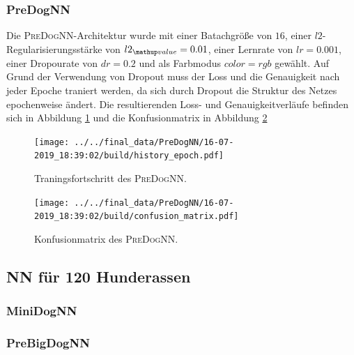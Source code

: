 \subsubsection{PreDogNN}
Die \textsc{PreDogNN}-Architektur wurde mit einer Batachgröße von $16$, einer
$l2$-Regularisierungsstärke von $l2\ua{value}=0.01$, einer Lernrate von
$lr=0.001$, einer Dropourate von $dr=0.2$ und als Farbmodus $color=rgb$ gewählt.
Auf Grund der Verwendung von Dropout muss der Loss und die Genauigkeit nach jeder
Epoche traniert werden, da sich durch Dropout die Struktur des Netzes epochenweise
ändert. Die resultierenden Loss- und Genauigkeitverläufe befinden sich in Abbildung
\ref{fig:PreDogNN_Loss_Acc} und die Konfusionmatrix in Abbildung \ref{fig:PreDogNN_Konfusionmatrix}
\begin{figure}
\centering
\texttt{[image: ../../final\_data/PreDogNN/16-07-2019\_18:39:02/build/history\_epoch.pdf]}
\caption{Traningsfortschritt des \textsc{PreDogNN}.}
\label{fig:PreDogNN_Loss_Acc}
\end{figure}
\begin{figure}
\centering
\texttt{[image: ../../final\_data/PreDogNN/16-07-2019\_18:39:02/build/confusion\_matrix.pdf]}
\caption{Konfusionmatrix des \textsc{PreDogNN}.}
\label{fig:PreDogNN_Konfusionmatrix}
\end{figure}
\subsection{NN für 120 Hunderassen}

\subsubsection{MiniDogNN}

\subsubsection{PreBigDogNN}
